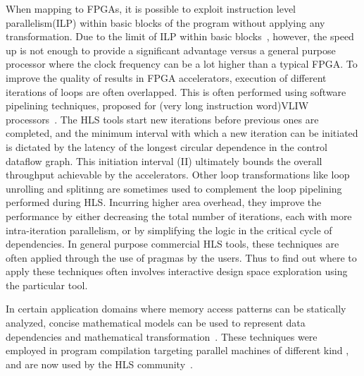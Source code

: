When mapping to FPGAs, it is possible to exploit instruction level parallelism(ILP) within basic blocks of the program without
applying any transformation. Due to the limit of ILP within basic blocks~\cite{Wall:1991:LIP:106972.106991}, however, the speed up 
is not enough to provide a significant advantage versus a general purpose processor where the clock frequency
can be a lot higher than a typical FPGA. To improve the quality of results in FPGA accelerators, execution of different iterations of loops are often overlapped. This is often  performed using software pipelining techniques,
proposed for (very long instruction word)VLIW processors~\cite{Lam:1988:SPE:53990.54022}\cite{Rau:1994:IMS:192724.192731}\cite{Tirumalai:1990:PLE:110382.110438}\cite{Allan:1995:SP:212094.212131}\cite{Ebcioglu:1987:CTS:255305.255317}.  The HLS tools start new iterations before previous ones are completed, and the minimum interval with which a new iteration can be initiated is dictated by the latency of the longest circular dependence in the control dataflow graph. This initiation interval (II) ultimately bounds the overall throughput achievable by the accelerators. Other loop transformations like loop unrolling and splitinng are sometimes used to complement the loop pipelining performed during HLS. Incurring higher area overhead, they improve the performance by either decreasing the total number of iterations, each with more intra-iteration parallelism, or by simplifying the logic in the critical cycle of dependencies. In general purpose commercial HLS tools, these techniques are often applied through
the use of pragmas by the users. Thus to find out where to apply these
techniques often involves interactive design space exploration using the particular
tool.

In certain application domains where memory access patterns
can be statically analyzed, concise mathematical models can be used to represent data dependencies and mathematical 
transformation~\cite{Ancourt:1991:SPL:109625.109631}\cite{putpolyd2work}\cite{polymorewidely}\cite{girbal2006semi}\cite{pugh1991uniform}\cite{wolf1991loop}. These techniques were employed in program compilation targeting parallel machines of different kind%
\cite{Bacon:1994:CTH:197405.197406}\cite{Hiranandani:1991:COF:125826.125886}\cite{feautrier1988semantical}, and are now used by the HLS community~\cite{Zuo:2013:IPC}\cite{Pouchet:2013}\cite{4785342}.


